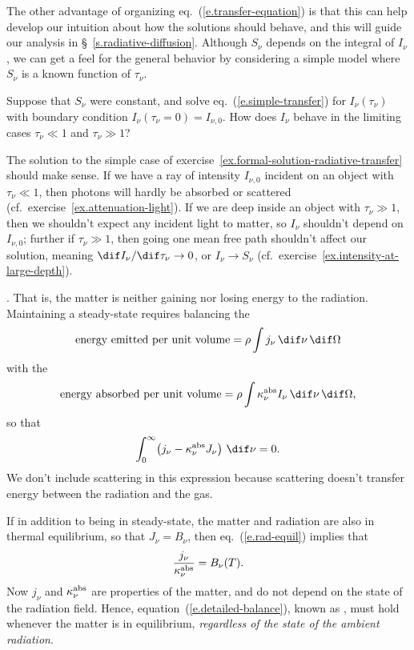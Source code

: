The other advantage of organizing eq.~(\ref{e.transfer-equation}) is that this can help develop our intuition about how the solutions should behave, and this will guide our analysis in \S~\ref{s.radiative-diffusion}. Although $S_{\nu}$ depends on the integral of $I_{\nu}$, we can get a feel for the general behavior by considering a simple model where $S_{\nu}$ is a known function of $\tau_{\nu}$.

\begin{exercisebox}
\label{ex.formal-solution-radiative-transfer}
Suppose that $S_{\nu}$ were constant, and solve eq.~(\ref{e.simple-transfer}) for $I_{\nu}(\tau_{\nu})$ with boundary condition $I_{\nu}(\tau_{\nu} = 0) = I_{\nu,0}$. How does $I_{\nu}$ behave in the limiting cases $\tau_{\nu}\ll1$ and $\tau_{\nu}\gg 1$?
\end{exercisebox}

The solution to the simple case of exercise~\ref{ex.formal-solution-radiative-transfer} should make sense. If we have a ray of intensity $I_{\nu,0}$ incident on an object with $\tau_{\nu}\ll 1$, then  photons will hardly be absorbed or scattered (cf.\ exercise~\ref{ex.attenuation-light}). If we are deep inside an object with $\tau_{\nu}\gg1$, then we shouldn't expect any incident light to matter, so $I_{\nu}$ shouldn't depend on $I_{\nu,0}$; further if $\tau_{\nu}\gg 1$, then going one mean free path shouldn't affect our solution, meaning $\dif I_{\nu}/\dif\tau_{\nu} \to 0$, or $I_{\nu}\to S_{\nu}$ (cf.\ exercise~\ref{ex.intensity-at-large-depth}).

. 
That is, the matter is neither gaining nor losing energy to the radiation. Maintaining a steady-state requires balancing the
\[ \textrm{energy emitted per unit volume} = \rho\int j_{\nu}\,\dif\nu\,\dif\Omega\] 
with the
\[ \textrm{energy absorbed per unit volume} = \rho\int \kapabs I_{\nu}\,\dif\nu\,\dif\Omega,\]
so that
\begin{equation}\label{e.rad-equil}
\int_{0}^{\infty}\! \left(j_{\nu} - \kapabs J_{\nu}\right)\,\dif\nu = 0.
\end{equation}
We don't include scattering in this expression because scattering doesn't transfer energy between the radiation and the gas.

If in addition to being in steady-state, the matter and radiation are also in thermal equilibrium, so that $J_{\nu} = B_{\nu}$, then eq.~(\ref{e.rad-equil}) implies that
\begin{equation}\label{e.detailed-balance}
\frac{j_{\nu}}{\kappa_\nu^{\mathrm{abs}}} = B_{\nu}(T).
\end{equation}
Now $j_{\nu}$ and $\kappa_\nu^{\mathrm{abs}}$ are properties of the matter, and do not depend on the state of the radiation field. Hence, equation~(\ref{e.detailed-balance}), known as , must hold whenever the matter is in equilibrium, \emph{regardless of the state of the ambient radiation}.

